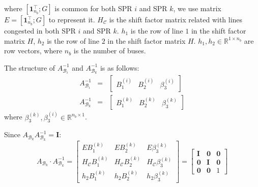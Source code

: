\documentclass[letterpaper, 11pt]{article}
\theoremstyle{plain}
\theoremstyle{definition}
\begin{document}
where $[\mathbf{1}_{n_b}^\intercal; G]$ is common for both SPR $i$ and SPR $k$, we use matrix $E = [\mathbf{1}_{n_b}^\intercal; G]$ to represent it. $H_{\mathcal{C}}$ is the shift factor matrix related with lines congested in both SPR $i$ and SPR $k$. $h_1$ is the row of line $1$ in the shift factor matrix $H$, $h_2$ is the row of line $2$ in the shift factor matrix $H$. $h_1, h_2 \in \mathbb{R}^{1\times n_b} $ are row vectors, where $n_b$ is the number of buses.


The structure of $A_{\mathcal{B}_i}^{-1}$ and $A_{\mathcal{B}_k}^{-1}$ is as follows:
\begin{eqnarray}
  A_{\mathcal{B}_i}^{-1} &=& 
  \begin{bmatrix}
    B_1^{(i)} & B_2^{(i)} & \beta_3^{(i)}
  \end{bmatrix}\\
  A_{\mathcal{B}_k}^{-1} &=& 
  \begin{bmatrix}
    B_1^{(k)} & B_2^{(k)} & \beta_3^{(k)}
  \end{bmatrix}
\end{eqnarray}
where $\beta_3^{(k)}, \beta_3^{(i)} \in \mathbb{R}^{n_b \times 1}$.


Since $A_{\mathcal{B}_k} A_{\mathcal{B}_k}^{-1} = \mathbf{I}$:
\begin{equation}
\label{eqn:inverse_AB_k}
  A_{\mathcal{B}_k} \cdot A_{\mathcal{B}_k}^{-1} = 
  \begin{bmatrix}
    E B_1^{(k)} & E B_2^{(k)} & E \beta_3^{(k)} \\
    H_{\mathcal{C}} B_1^{(k)} & H_{\mathcal{C}} B_2^{(k)} & H_{\mathcal{C}} \beta_3^{(k)} \\
    h_2 B_1^{(k)} & h_2 B_2^{(k)} & h_2 \beta_3^{(k)}
  \end{bmatrix}
  = \begin{bmatrix}
    \mathbf{I} & \mathbf{0} & \mathbf{0} \\
    \mathbf{0} & \mathbf{I} & \mathbf{0} \\
    \mathbf{0} & \mathbf{0} & 1
  \end{bmatrix}
\end{equation}
\end{document}
